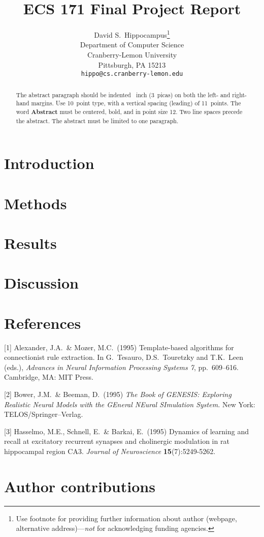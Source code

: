 \documentclass{article}
\title{ECS 171 Final Project Report}
\author{%
	David S.~Hippocampus\thanks{Use footnote for providing further information
		about author (webpage, alternative address)---\emph{not} for acknowledging
		funding agencies.} \\
	Department of Computer Science\\
	Cranberry-Lemon University\\
	Pittsburgh, PA 15213 \\
	\texttt{hippo@cs.cranberry-lemon.edu} \\
}
\begin{document}
	
	\maketitle
	
	\begin{abstract}
		The abstract paragraph should be indented ~inch (3~picas) on
		both the left- and right-hand margins. Use 10~point type, with a vertical
		spacing (leading) of 11~points.  The word \textbf{Abstract} must be centered,
		bold, and in point size 12. Two line spaces precede the abstract. The abstract
		must be limited to one paragraph.
	\end{abstract}
	
	\section{Introduction}
	
	
	
	\section{Methods}
	
	
	
	\section{Results}
	
	
	
	\section{Discussion}
	
	
	
	\section*{References}
	
	
	[1] Alexander, J.A.\ \& Mozer, M.C.\ (1995) Template-based algorithms for
	connectionist rule extraction. In G.\ Tesauro, D.S.\ Touretzky and T.K.\ Leen
	(eds.), {\it Advances in Neural Information Processing Systems 7},
	pp.\ 609--616. Cambridge, MA: MIT Press.
	
	[2] Bower, J.M.\ \& Beeman, D.\ (1995) {\it The Book of GENESIS: Exploring
		Realistic Neural Models with the GEneral NEural SImulation System.}  New York:
	TELOS/Springer--Verlag.
	
	[3] Hasselmo, M.E., Schnell, E.\ \& Barkai, E.\ (1995) Dynamics of learning and
	recall at excitatory recurrent synapses and cholinergic modulation in rat
	hippocampal region CA3. {\it Journal of Neuroscience} {\bf 15}(7):5249-5262.
	
	
	\section{Author contributions}
	
	
	
	
\end{document}
